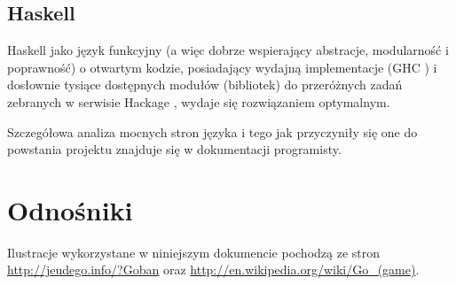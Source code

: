 \documentclass[11pt,leqno]{article}
\begin{document}
\subsection{Haskell}
Haskell \cite{haskell} jako język funkcyjny (a więc dobrze wspierający abstracje,
 modularność i poprawność) o otwartym kodzie, posiadający wydajną implementacje (GHC \cite{ghc}) i dosłownie tysiące dostępnych modułów
 (bibliotek) do przeróżnych zadań zebranych w serwisie Hackage \cite{hackage}, wydaje się rozwiązaniem optymalnym.

Szczegółowa analiza mocnych stron języka i tego jak przyczyniły się one do powstania projektu znajduje się w dokumentacji programisty.

\section{Odnośniki}
Ilustracje wykorzystane w niniejszym dokumencie pochodzą ze stron \url{http://jeudego.info/?Goban} oraz 
\url{http://en.wikipedia.org/wiki/Go\_(game)}.
\end{document}

